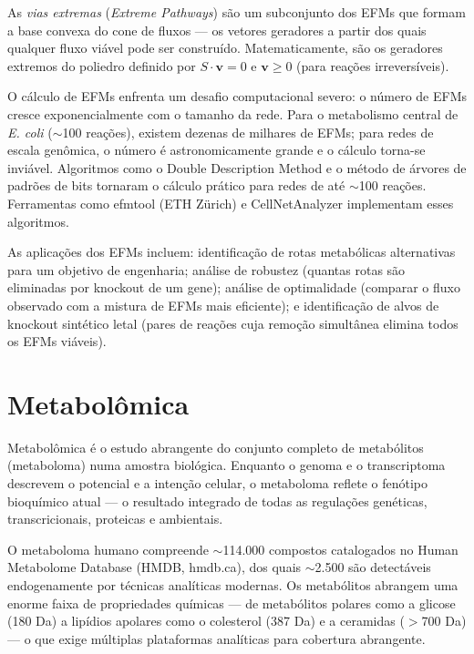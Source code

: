 As \emph{vias extremas} (\textit{Extreme Pathways}) são um subconjunto dos EFMs que
formam a base convexa do cone de fluxos --- os vetores geradores a partir dos quais
qualquer fluxo viável pode ser construído. Matematicamente, são os geradores extremos
do poliedro definido por $S \cdot \mathbf{v} = 0$ e $\mathbf{v} \geq 0$ (para reações
irreversíveis).

O cálculo de EFMs enfrenta um desafio computacional severo: o número de EFMs cresce
exponencialmente com o tamanho da rede. Para o metabolismo central de \textit{E. coli}
($\sim$100 reações), existem dezenas de milhares de EFMs; para redes de escala genômica,
o número é astronomicamente grande e o cálculo torna-se inviável. Algoritmos como o
Double Description Method e o método de árvores de padrões de bits tornaram o cálculo
prático para redes de até $\sim$100 reações. Ferramentas como efmtool (ETH Zürich) e
CellNetAnalyzer implementam esses algoritmos.

As aplicações dos EFMs incluem: identificação de rotas metabólicas alternativas para
um objetivo de engenharia; análise de robustez (quantas rotas são eliminadas por knockout
de um gene); análise de optimalidade (comparar o fluxo observado com a mistura de EFMs
mais eficiente); e identificação de alvos de knockout sintético letal (pares de reações
cuja remoção simultânea elimina todos os EFMs viáveis).

\section{Metabolômica}

\begin{definicaoenv}[Metabolômica]
Metabolômica é o estudo abrangente do conjunto completo de metabólitos (metaboloma) numa
amostra biológica. Enquanto o genoma e o transcriptoma descrevem o potencial e a
intenção celular, o metaboloma reflete o fenótipo bioquímico atual --- o resultado
integrado de todas as regulações genéticas, transcricionais, proteicas e ambientais.
\end{definicaoenv}

O metaboloma humano compreende $\sim$114.000 compostos catalogados no Human Metabolome
Database (HMDB, hmdb.ca), dos quais $\sim$2.500 são detectáveis endogenamente por
técnicas analíticas modernas. Os metabólitos abrangem uma enorme faixa de propriedades
químicas --- de metabólitos polares como a glicose (180 Da) a lipídios apolares como
o colesterol (387 Da) e a ceramidas ($>$700 Da) --- o que exige múltiplas plataformas
analíticas para cobertura abrangente.

